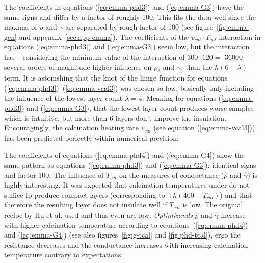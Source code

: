 The coefficients in equations (\ref{eq:emma-phd3}) and (\ref{eq:emma-G3}) have the same signs and differ by a factor of roughly 100.
This fits the data well since the maxima of $\rho$ and $\gamma$ are separated by rough factor of 100 (see figure~\ref{fig:emma-gen} and appendix~\ref{sec:app-emma}). %
The coefficients of the $v_{cal} \cdot T_{cal}$ interaction in equations (\ref{eq:emma-phd3}) and (\ref{eq:emma-G3}) 
seem low, but the interaction has -- considering the minimum value of the interaction of $300 \cdot 120 =$  \num{36000} -- several orders of magnitude higher influence on $\rho_3$ and $\gamma_3$ than the $h(6-\lambda)$ term. 
It is astonishing that the knot of the hinge function for equations (\ref{eq:emma-phd3})--(\ref{eq:emma-vcal3}) was chosen so low; 
basically only including the influence of the lowest layer count $\lambda=4$.
Meaning for equations (\ref{eq:emma-phd3}) and (\ref{eq:emma-G3}), that the lowest layer count produces worse samples which is intuitive, but more than 6 layers don't improve the insulation. 
Encouragingly, the calcination heating rate $v_{cal}$ (see equation (\ref{eq:emma-vcal3})) has been predicted perfectly within numerical precision. 

The coefficients of equations (\ref{eq:emma-phd4}) and (\ref{eq:emma-G4}) show the same pattern 
as equations (\ref{eq:emma-phd3}) and (\ref{eq:emma-G3}): identical signs and factor 100. 
%
The influence of $T_{cal}$ on the measures of conductance ($\hat\rho$ and $\hat\gamma$) is highly interesting. 
It was expected that 
calcination temperatures under  do not suffice to produce compact layers (corresponding to $+h(400-T_{cal})$)
and 
that therefore the resulting layer does not insulate well if $T_{cal}$ is low. 
The original recipe by Hu et al.\cite{Hu2016} used  and thus even  are low.
\textit{Optimizands} $\hat\rho$ and $\hat{\gamma}$ increase with higher calcination temperature 
according to equations~(\ref{eq:emma-phd4}) and (\ref{eq:emma-G4}) (see also figures~\ref{fig:g-tcal} and \ref{fig:phd-tcal}), 
ergo the resistance decreases and the conductance increases with increasing calcination temperature contrary to expectations.

